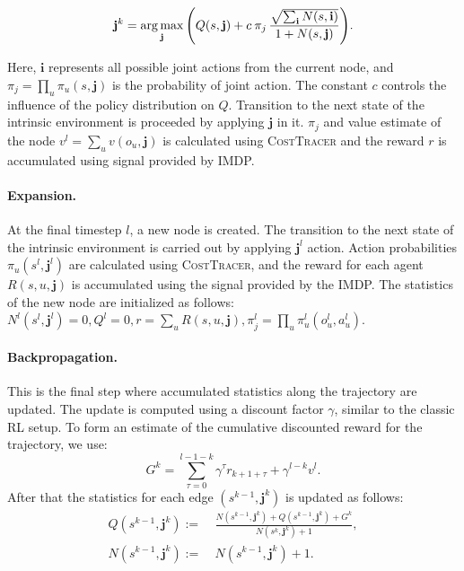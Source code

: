 \documentclass[letterpaper]{article} %
\newcommand{\argmax}{\operatornamewithlimits{arg\,max}}  %
\begin{document}
\begin{equation*}
    \mathbf{j}^k = \argmax_{\mathbf{j}} \Bigg( {Q(s, \mathbf{j}}) + c\:\pi_j\,\frac{\sqrt{\sum_\mathbf{i}{N(s, \mathbf{i})}}}{1 + N(s,\mathbf{j})} \Bigg).
\end{equation*}

Here, $\mathbf{i}$ represents all possible joint actions from the current node, and $\pi_j=\prod_u{\pi_u(s,\mathbf{j})}$ is the probability of joint action. The constant $c$ controls the influence of the policy distribution on $Q$. Transition to the next state of the intrinsic environment is proceeded by applying $\mathbf{j}$ in it. $\pi_j$ and value estimate of the node $v^l = \sum_u{v(o_u, \mathbf{j})}$ is calculated using \textsc{CostTracer} and  the reward $r$ is accumulated using signal provided by IMDP. 

\paragraph{Expansion.} At the final timestep $l$, a new node is created. The transition to the next state of the intrinsic environment is carried out by applying $\mathbf{j}^l$ action. Action probabilities $\pi_u(s^l,\mathbf{j}^l)$ are calculated using \textsc{CostTracer}, and the reward for each agent $R(s,u, \mathbf{j})$ is accumulated using the signal provided by the  IMDP. The statistics of the new node are initialized as follows: $N^l(s^l, \mathbf{j}^l)=0, Q^l=0, r=\sum_u{R(s,u, \mathbf{j})}, \pi_j^l= \prod_u{\pi_u^l(o_u^l,a_u^l)}$.

\paragraph{Backpropagation.} This is the final step where accumulated statistics along the trajectory are updated. The update is computed using a discount factor $\gamma$, similar to the classic RL setup. To form an estimate of the cumulative discounted reward for the trajectory, we use:
\begin{equation*}
G^k = \sum_{\tau=0}^{l-1-k}\gamma^\tau r_{k+1+\tau}+\gamma^{l-k}v^l.    
\end{equation*}
After that the statistics for each edge $(s^{k-1}, \mathbf{j}^k)$ is updated as follows:
\begin{equation*}
\begin{aligned}
  Q(s^{k-1},\mathbf{j}^k) := &\: \frac{N(s^{k-1},  \mathbf{j}^k) + Q(s^{k-1},\mathbf{j}^k) + G^k}{N(s^{k},  \mathbf{j}^k) + 1}, \\ 
N(s^{k-1}, \mathbf{j}^k) := &\: N(s^{k-1},  \mathbf{j}^k) + 1.  
  \end{aligned}
\end{equation*}
\end{document}
